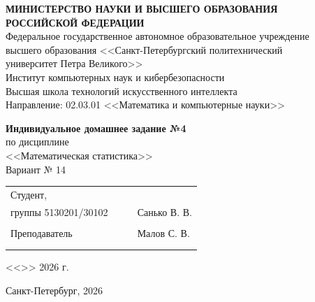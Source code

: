 \documentclass[12pt,a4paper]{article}
\begin{document}
	
	\thispagestyle{empty}
	\begin{titlepage}
		\begin{center}
			\textbf{МИНИСТЕРСТВО НАУКИ И ВЫСШЕГО ОБРАЗОВАНИЯ\\
				РОССИЙСКОЙ ФЕДЕРАЦИИ}\\[6pt]
			Федеральное государственное автономное образовательное учреждение\\
			высшего образования <<Санкт-Петербургский политехнический\\
			университет Петра Великого>>\\[6pt]
			Институт компьютерных наук и кибербезопасности\\
			Высшая школа технологий искусственного интеллекта\\[6pt]
			Направление: 02.03.01 <<Математика и компьютерные науки>>
			
			\vfill
			
			{\large\textbf{Индивидуальное домашнее задание №4}}\\[6pt]
			по дисциплине\\[4pt]
			{\large <<Математическая статистика>>}\\[12pt]
			{\large Вариант №{} 14}
			
			\vfill
			
			\small{
				\begin{tabular}{lrrl}
					\!\!\!Студент, & \hspace{2cm} & & \\
					\!\!\!группы 5130201/30102 & \hspace{2cm} & \underline{\hspace{3cm}} & Санько В. В. \\\\
					\!\!\!Преподаватель & \hspace{2cm} & \underline{\hspace{3cm}} & Малов С. В. \\\\
					&&\hspace{4cm}
				\end{tabular}
				\begin{flushright}
					<<\underline{\hspace{1cm}}>>\underline{\hspace{2.5cm}} 2026 г.
				\end{flushright}
			}
			
			\hfill\break
			\begin{center}\small{Санкт-Петербург, 2026}\end{center}
		\end{center}
	\end{titlepage}
\end{document}
